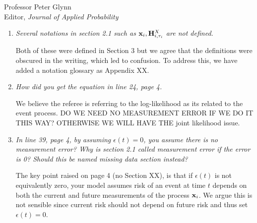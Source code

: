 \documentclass[11pt]{letter} %
\begin{document}
\begin{letter}{Professor
	Peter Glynn\\
	Editor, {\em Journal of Applied Probability}}
\begin{enumerate}
\vspace{5mm}
We have now omitted this part from the current manuscript. The key issue we were trying to clarify is that the traditional joint model formulation in which the observed health process and time-to-event are conditionally independent given the latent process implies that the hazard function conditional on the entire observed health process depends on values after the current time.  In the case study, for example, this implies that the expected risk of a button press given the entire sensor process will depend on future activity index and electrodermal activity.  This holds unless we assume the measurement error is set to zero.  In this setting,~$\epsilon_i (t) = 0$ and so $\int_{t-\Delta}^t \epsilon_i (s) \beta(s)ds = 0$ by definition. While the author still thinks it an important point that he wishes was more well appreciated in the joint modeling literature, the current paper has enough content for this discussion to be omitted.  Moreover, the empirical impact seems to be limited and therefore it is better to make this point in a different manuscript and case study.
\vspace{5mm}

\item {\it Several notations in section 2.1 such as ${\bf x}_i, {\bf H}_{i,\tau_i}^X$ are not defined.}

\vspace{5mm}
Both of these were defined in Section 3 but we agree that the definitions were obscured in the writing, which led to confusion.  To address this, we have added a notation glossary as Appendix XX.
\vspace{5mm}

\item {\it How did you get the equation in line 24, page 4.}

\vspace{5mm}
We believe the referee is referring to the log-likelihood as its related to the event process. DO WE NEED NO MEASUREMENT ERROR IF WE DO IT THIS WAY? OTHERWISE WE WILL HAVE THE joint likelihood issue.
\vspace{5mm}

\item {\it In line 39, page 4, by assuming $\epsilon(t) = 0$, you assume there is no measurement error? Why is section 2.1 called measurement error if the error is 0? Should this be named missing data section instead?}

\vspace{5mm}
The key point raised on page 4 (no Section XX), is that if $\epsilon(t)$ is not equivalently zero, your model assumes risk of an event at time $t$ depends on both the current and future measurements of the process ${\bf x}_i$. We argue this is not sensible since current risk should not depend on future risk and thus set $\epsilon(t) = 0$.
\vspace{5mm}


\end{enumerate}
\end{letter}
\end{document}
